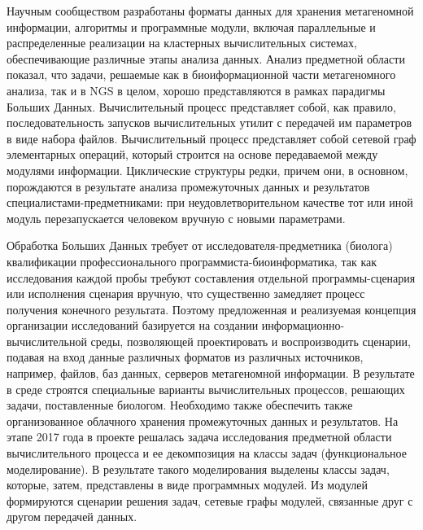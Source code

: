 \documentclass[a4paper,12pt,openany,final]{extreport}
\begin{document}
Научным сообществом разработаны форматы данных для хранения метагеномной
информации, алгоритмы и программные модули, включая параллельные и
распределенные реализации на кластерных вычислительных системах,
обеспечивающие различные этапы анализа данных. Анализ предметной области
показал, что задачи, решаемые как в биоиформационной части метагеномного
анализа, так и в NGS в целом, хорошо представляются в рамках парадигмы
Больших Данных. Вычислительный процесс представляет собой, как правило,
последовательность запусков вычислительных утилит с передачей им
параметров в виде набора файлов. Вычислительный процесс представляет
собой сетевой граф элементарных операций, который строится на основе
передаваемой между модулями информации. Циклические структуры редки,
причем они, в основном, порождаются в результате анализа промежуточных
данных и результатов специалистами-предметниками: при
неудовлетворительном качестве тот или иной модуль перезапускается
человеком вручную с новыми параметрами.

Обработка Больших Данных требует от исследователя-предметника (биолога)
квалификации профессионального программиста-биоинформатика, так как
исследования каждой пробы требуют составления отдельной
программы-сценария или исполнения сценария вручную, что существенно
замедляет процесс получения конечного результата. Поэтому предложенная и
реализуемая концепция организации исследований базируется на создании
информационно-вычислительной среды, позволяющей проектировать и
воспроизводить сценарии, подавая на вход данные различных форматов из
различных источников, например, файлов, баз данных, серверов
метагеномной информации. В результате в среде строятся специальные
варианты вычислительных процессов, решающих задачи, поставленные
биологом. Необходимо также обеспечить также организованное облачного
хранения промежуточных данных и результатов. На этапе 2017 года в
проекте решалась задача исследования предметной области вычислительного
процесса и ее декомпозиция на классы задач (функциональное
моделирование). В результате такого моделирования выделены классы задач,
которые, затем, представлены в виде программных модулей. Из модулей
формируются сценарии решения задач, сетевые графы модулей, связанные
друг с другом передачей данных.
\end{document}
